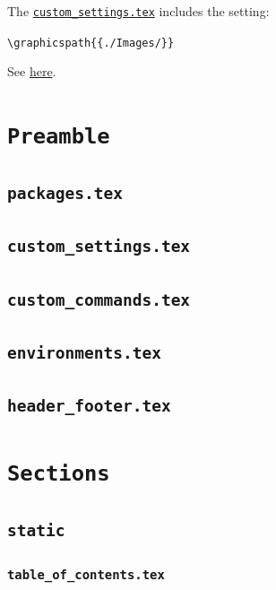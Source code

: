 The \hyperref[sec:custom_settings.tex]{\texttt{custom\_settings.tex}} includes the setting:
\begin{center}
    \lstinline|\graphicspath{{./Images/}}|
\end{center}

See \href{https://en.wikibooks.org/wiki/LaTeX/Importing_Graphics}{here}.


\section{\texttt{Preamble}}
\label{sec:preamble}

\subsection{\texttt{packages.tex}}
\label{sec:packages.tex}

\subsection{\texttt{custom\_settings.tex}}
\label{sec:custom_settings.tex}

\subsection{\texttt{custom\_commands.tex}}
\label{sec:custom_commands.tex}

\subsection{\texttt{environments.tex}}
\label{sec:environments.tex}

\subsection{\texttt{header\_footer.tex}}
\label{sec:header_footer.tex}

\section{\texttt{Sections}}
\label{sec:sections}

\subsection{\texttt{static}}
\label{sec:static}

\subsubsection{\texttt{table\_of\_contents.tex}}
\label{sec:table_of_contents.tex}

